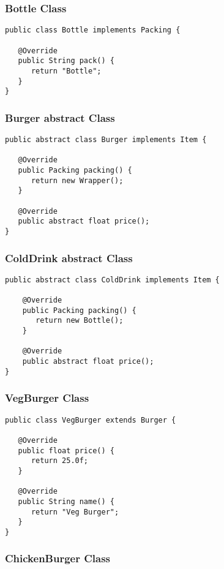 \subsubsection{Bottle Class}

\begin{verbatim}
public class Bottle implements Packing {

   @Override
   public String pack() {
      return "Bottle";
   }
}
\end{verbatim}

\subsubsection{Burger abstract Class}

\begin{verbatim}
public abstract class Burger implements Item {

   @Override
   public Packing packing() {
      return new Wrapper();
   }

   @Override
   public abstract float price();
}
\end{verbatim}

\subsubsection{ColdDrink abstract Class}

\begin{verbatim}
public abstract class ColdDrink implements Item {

	@Override
	public Packing packing() {
       return new Bottle();
	}

	@Override
	public abstract float price();
}
\end{verbatim}

\subsubsection{VegBurger Class}

\begin{verbatim}
public class VegBurger extends Burger {

   @Override
   public float price() {
      return 25.0f;
   }

   @Override
   public String name() {
      return "Veg Burger";
   }
}
\end{verbatim}

\subsubsection{ChickenBurger Class}

